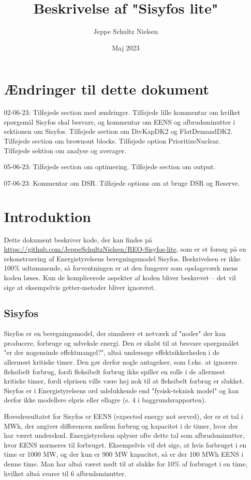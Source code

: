 \documentclass{article}
\title{Beskrivelse af "Sisyfos lite"}
\author{Jeppe Schultz Nielsen}
\date{Maj 2023}
\begin{document}
\maketitle
\tableofcontents
\section{Ændringer til dette dokument}
02-06-23: Tilføjede section med ændringer. Tilføjede lille kommentar om hvilket spørgsmål Sisyfos skal besvare, og kommentar om EENS og afbrudsminutter i sektionen om Sisyfos. Tilføjede section om DivKapDK2 og FlatDemandDK2. Tilføjede section om brownout blocks. Tilføjede option PrioritizeNuclear. Tilføjede sektion om analyse og averager.

05-06-23: Tilføjede section om optimering. Tilføjede section om output.

07-06-23: Kommentar om DSR. Tilføjede options om at bruge DSR og Reserve.
\section{Introduktion}
Dette dokument beskriver kode, der kan findes på \url{https://github.com/JeppeSchultzNielsen/REO-Sisyfos-lite}, som er et forsøg på en rekonstruering af Energistyrelsens beregningsmodel Sisyfos. Beskrivelsen er ikke 100\% udtømmende, så forventningen er at den fungerer som opslagsværk mens koden læses. Kun de komplicerede aspekter af koden bliver beskrevet -- det vil sige at eksempelvis getter-metoder bliver ignoreret. 
\subsection{Sisyfos}
Sisyfos er en beregningsmodel, der simulerer et netværk af "noder" der kan producere, forbruge og udveksle energi. Den er skabt til at besvare spørgsmålet "er der nogensinde effektmangel?", altså undersøge effektsikkerheden i de allermest kritiske timer. Den gør derfor nogle antagelser, som f.eks. at ignorere fleksibelt forbrug, fordi fleksibelt forbrug ikke spiller en rolle i de allermest kritiske timer, fordi elprisen ville være høj nok til at fleksibelt forbrug er slukket. Sisyfos er i Energistyrelsens ord udelukkende end "fysisk-teknisk model" og kan derfor ikke modellere elpris eller ellagre (s. 4 i baggrundsrapporten). 

Hovedresultatet for Sisyfos er EENS (expected energy not served), der er et tal i MWh, der angiver differencen mellem forbrug og kapacitet i de timer, hvor der har været underskud. Energistyrelsen oplyser ofte dette tal som afbrudsminutter, hvor EENS normeres til forbruget. Eksempelvis vil det sige, at hvis forbruget i en time er 1000 MW, og der kun er 900 MW kapacitet, så er der 100 MWh EENS i denne time. Man har altså været nødt til at slukke for 10\% af forbruget i en time, hvilket altså svarer til 6 afbrudsminutter.
\end{document}
